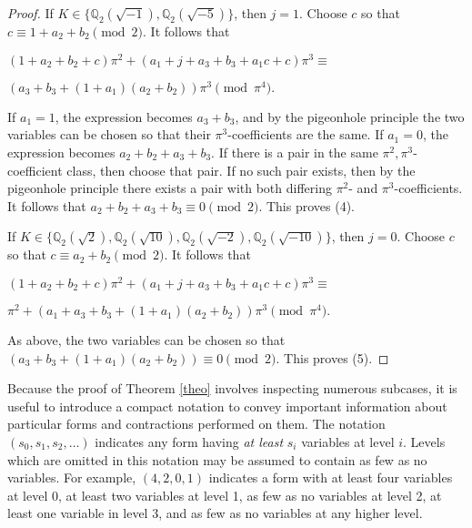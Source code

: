 \documentclass[12pt]{amsart}
\begin{document}
\begin{proof}
\bigskip

If $K \in \{\mathbb{Q}_2(\sqrt{-1}), \mathbb{Q}_2(\sqrt{-5})\}$, then $j=1$.  Choose $c$ so that $c \equiv 1 + a_2 + b_2 \pmod{2}$.  It follows that

\smallskip

$(1 + a_2 + b_2 + c)\pi^2 + (a_1 + j + a_3 + b_3 + a_1c + c)\pi^3 \equiv$

$(a_3 + b_3 + (1 + a_1)(a_2 + b_2))\pi^3 \pmod{\pi^4}.$

\smallskip

If $a_1 = 1$, the expression becomes $a_3 + b_3$, and by the pigeonhole principle the two variables can be chosen so that their $\pi^3$-coefficients are the same.  If $a_1=0$, the expression becomes $a_2 + b_2 + a_3 + b_3$.  If there is a pair in the same $\pi^2,\pi^3$-coefficient class, then choose that pair.  If no such pair exists, then by the pigeonhole principle there exists a pair with both differing $\pi^2$- and $\pi^3$-coefficients.  It follows that $a_2 + b_2 + a_3 + b_3 \equiv 0 \pmod{2}$.  This proves (4).

\bigskip

If $K \in \{\mathbb{Q}_2(\sqrt{2}), \mathbb{Q}_2(\sqrt{10}), \mathbb{Q}_2(\sqrt{-2}), \mathbb{Q}_2(\sqrt{-10})\}$, then $j=0$.  Choose $c$ so that $c \equiv a_2 + b_2 \pmod{2}$.  It follows that

\smallskip

$(1 + a_2 + b_2 + c)\pi^2 + (a_1 + j + a_3 + b_3 + a_1c + c)\pi^3 \equiv$

$\pi^2 + (a_1 + a_3 + b_3 + (1 + a_1)(a_2 + b_2))\pi^3 \pmod{\pi^4}.$

\smallskip

As above, the two variables can be chosen so that $(a_3 + b_3 + (1 + a_1)(a_2 + b_2)) \equiv 0 \pmod{2}$.  This proves (5).
\end{proof}

Because the proof of Theorem \ref{theo} involves inspecting numerous subcases, it is useful to introduce a compact notation to convey important information about particular forms and contractions performed on them.  The notation $(s_0, s_1, s_2, \ldots)$ indicates any form having \textit{at least} $s_i$ variables at level $i$.  Levels which are omitted in this notation may be assumed to contain as few as no variables.  For example, $(4, 2, 0, 1)$ indicates a form with at least four variables at level 0, at least two variables at level 1, as few as no variables at level 2, at least one variable in level 3, and as few as no variables at any higher level.
\end{document}
